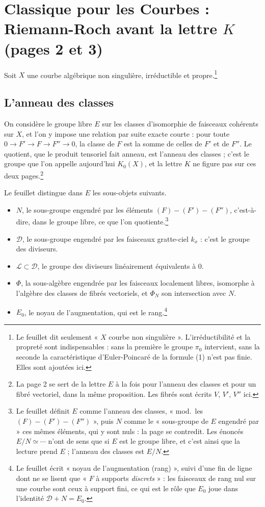 \documentclass[11pt,a4paper]{article}
\begin{document}
\section*{Classique pour les Courbes : Riemann-Roch avant la lettre $K$ (pages 2 et 3)}

Soit $X$ une courbe algébrique non singulière, irréductible et
propre.\footnote{Le feuillet dit seulement « $X$ courbe non singulière ».
L'irréductibilité et la propreté sont indispensables : sans la première le
groupe $\pi_{0}$ intervient, sans la seconde la caractéristique
d'Euler-Poincaré de la formule (1) n'est pas finie. Elles sont ajoutées ici.}

\subsection*{L'anneau des classes}

On considère le groupe libre $E$ sur les classes d'isomorphie de faisceaux
cohérents sur $X$, et l'on y impose une relation par suite exacte courte : pour
toute $0 \to F' \to F \to F'' \to 0$, la classe de $F$ est la somme de celles
de $F'$ et de $F''$. Le quotient, que le produit tensoriel fait anneau, est
l'anneau des classes ; c'est le groupe que l'on appelle aujourd'hui $K_{0}(X)$,
et la lettre $K$ ne figure pas sur ces deux pages.\footnote{La page 2 se sert de
la lettre $E$ à la fois pour l'anneau des classes et pour un fibré vectoriel,
dans la même proposition. Les fibrés sont écrits $V$, $V'$, $V''$ ici.}

Le feuillet distingue dans $E$ les sous-objets suivants.

\begin{itemize}
  \item $N$, le sous-groupe engendré par les éléments $(F) - (F') - (F'')$,
  c'est-à-dire, dans le groupe libre, ce que l'on quotiente.\footnote{Le
  feuillet définit $E$ comme l'anneau des classes, « mod.\ les $(F) - (F') -
  (F'')$ », puis $N$ comme le « sous-groupe de $E$ engendré par » ces mêmes
  éléments, qui y sont nuls : la page se contredit. Les énoncés $E/N \simeq
  \cdots$ n'ont de sens que si $E$ est le groupe libre, et c'est ainsi que la
  lecture prend $E$ ; l'anneau des classes est $E/N$.}
  \item $\mathcal{D}$, le sous-groupe engendré par les faisceaux gratte-ciel
  $k_{x}$ : c'est le groupe des diviseurs.
  \item $\mathcal{L} \subset \mathcal{D}$, le groupe des diviseurs
  linéairement équivalents à $0$.
  \item $\Phi$, la sous-algèbre engendrée par les faisceaux localement libres,
  isomorphe à l'algèbre des classes de fibrés vectoriels, et $\Phi_{N}$ son
  intersection avec $N$.
  \item $E_{0}$, le noyau de l'augmentation, qui est le rang.\footnote{Le
  feuillet écrit « noyau de l'augmentation (rang) », suivi d'une fin de ligne
  dont ne se lisent que « $F$ à supports \emph{discrets} » : les faisceaux de
  rang nul sur une courbe sont ceux à support fini, ce qui est le rôle que
  $E_{0}$ joue dans l'identité $\mathcal{D} + N = E_{0}$.}
\end{itemize}
\end{document}
